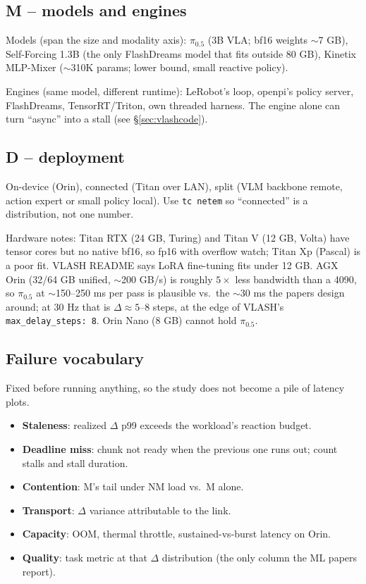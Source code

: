 \documentclass[10pt,letterpaper]{article}
\begin{document}
\subsection{M -- models and engines}

Models (span the size and modality axis): $\pi_{0.5}$ (3B VLA; bf16 weights $\sim$7 GB), Self-Forcing 1.3B (the only FlashDreams model that fits outside 80 GB), Kinetix MLP-Mixer ($\sim$310K params; lower bound, small reactive policy).

Engines (same model, different runtime): LeRobot's loop, openpi's policy server, FlashDreams, TensorRT/Triton, own threaded harness. The engine alone can turn ``async'' into a stall (see \S\ref{sec:vlashcode}).

\subsection{D -- deployment}

On-device (Orin), connected (Titan over LAN), split (VLM backbone remote, action expert or small policy local). Use \texttt{tc netem} so ``connected'' is a distribution, not one number.

Hardware notes: Titan RTX (24 GB, Turing) and Titan V (12 GB, Volta) have tensor cores but no native bf16, so fp16 with overflow watch; Titan Xp (Pascal) is a poor fit. VLASH README says LoRA fine-tuning fits under 12 GB. AGX Orin (32/64 GB unified, $\sim$200 GB/s) is roughly $5\times$ less bandwidth than a 4090, so $\pi_{0.5}$ at $\sim$150--250 ms per pass is plausible vs.\ the $\sim$30 ms the papers design around; at 30 Hz that is $\Delta \approx 5$--8 steps, at the edge of VLASH's \texttt{max\_delay\_steps: 8}. Orin Nano (8 GB) cannot hold $\pi_{0.5}$.

\subsection{Failure vocabulary}\label{sec:fail}

Fixed before running anything, so the study does not become a pile of latency plots.

\begin{itemize}
\item \textbf{Staleness}: realized $\Delta$ p99 exceeds the workload's reaction budget.
\item \textbf{Deadline miss}: chunk not ready when the previous one runs out; count stalls and stall duration.
\item \textbf{Contention}: M's tail under NM load vs.\ M alone.
\item \textbf{Transport}: $\Delta$ variance attributable to the link.
\item \textbf{Capacity}: OOM, thermal throttle, sustained-vs-burst latency on Orin.
\item \textbf{Quality}: task metric at that $\Delta$ distribution (the only column the ML papers report).
\end{itemize}
\end{document}
